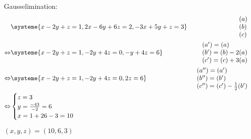\begin{task}{1.3}
	Gausselimination:
	\begin{align*}
		&\systeme{
			x-2y+ z=1,
			2x-6y+6z=2,
			-3x+5y+ z=3}  
		&\begin{array}{l} 
			(a) \\ 
			(b) \\
			(c)
		\end{array} \\ \lra
		&\systeme{
			x-2y+ z=1,
			-2y+4z=0,
			- y+4z=6}  
		&\begin{array}{l} 
			(a')=(a) \\ 
			(b')=(b)-2(a) \\
			(c')=(c)+3(a)
		\end{array} \\ \lra
		&\systeme{
			x-2y+ z=1,
			-2y+4z=0,
			2z=6}  
		&\begin{array}{l} 
			(a'')=(a') \\ 
			(b'')=(b') \\
			(c'')=(c')-\frac{1}{2}(b')
		\end{array} \\ \lra
		&\begin{cases}
			z=3 \\
			y=\frac{-4\*3}{-2} =6\\
			x=1+2\*6-3=10
		\end{cases}
	\end{align*}
		
	\ans $(x,y,z)=(10,6,3)$
\end{task}

\pagebreak

